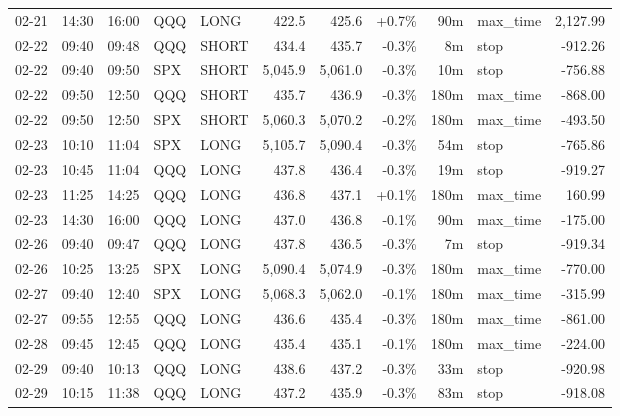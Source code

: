 \documentclass[11pt,a4paper,twoside]{article}
\begin{document}
\begin{center}
\begin{longtable}{>{\color{txtmain}}l l l l l r r r r >{\color{txtmain}}l r}
02-21 & 14:30 & 16:00 & QQQ & LONG & 422.5 & 425.6 & \textcolor{wingreen}{+0.7\%} & 90m & max\_time & \textcolor{wingreen}{2,127.99} \\
02-22 & 09:40 & 09:48 & QQQ & SHORT & 434.4 & 435.7 & \textcolor{lossred}{-0.3\%} & 8m & stop & \textcolor{lossred}{-912.26} \\
02-22 & 09:40 & 09:50 & SPX & SHORT & 5,045.9 & 5,061.0 & \textcolor{lossred}{-0.3\%} & 10m & stop & \textcolor{lossred}{-756.88} \\
02-22 & 09:50 & 12:50 & QQQ & SHORT & 435.7 & 436.9 & \textcolor{lossred}{-0.3\%} & 180m & max\_time & \textcolor{lossred}{-868.00} \\
02-22 & 09:50 & 12:50 & SPX & SHORT & 5,060.3 & 5,070.2 & \textcolor{lossred}{-0.2\%} & 180m & max\_time & \textcolor{lossred}{-493.50} \\
02-23 & 10:10 & 11:04 & SPX & LONG & 5,105.7 & 5,090.4 & \textcolor{lossred}{-0.3\%} & 54m & stop & \textcolor{lossred}{-765.86} \\
02-23 & 10:45 & 11:04 & QQQ & LONG & 437.8 & 436.4 & \textcolor{lossred}{-0.3\%} & 19m & stop & \textcolor{lossred}{-919.27} \\
02-23 & 11:25 & 14:25 & QQQ & LONG & 436.8 & 437.1 & \textcolor{wingreen}{+0.1\%} & 180m & max\_time & \textcolor{wingreen}{160.99} \\
02-23 & 14:30 & 16:00 & QQQ & LONG & 437.0 & 436.8 & \textcolor{lossred}{-0.1\%} & 90m & max\_time & \textcolor{lossred}{-175.00} \\
02-26 & 09:40 & 09:47 & QQQ & LONG & 437.8 & 436.5 & \textcolor{lossred}{-0.3\%} & 7m & stop & \textcolor{lossred}{-919.34} \\
02-26 & 10:25 & 13:25 & SPX & LONG & 5,090.4 & 5,074.9 & \textcolor{lossred}{-0.3\%} & 180m & max\_time & \textcolor{lossred}{-770.00} \\
02-27 & 09:40 & 12:40 & SPX & LONG & 5,068.3 & 5,062.0 & \textcolor{lossred}{-0.1\%} & 180m & max\_time & \textcolor{lossred}{-315.99} \\
02-27 & 09:55 & 12:55 & QQQ & LONG & 436.6 & 435.4 & \textcolor{lossred}{-0.3\%} & 180m & max\_time & \textcolor{lossred}{-861.00} \\
02-28 & 09:45 & 12:45 & QQQ & LONG & 435.4 & 435.1 & \textcolor{lossred}{-0.1\%} & 180m & max\_time & \textcolor{lossred}{-224.00} \\
02-29 & 09:40 & 10:13 & QQQ & LONG & 438.6 & 437.2 & \textcolor{lossred}{-0.3\%} & 33m & stop & \textcolor{lossred}{-920.98} \\
02-29 & 10:15 & 11:38 & QQQ & LONG & 437.2 & 435.9 & \textcolor{lossred}{-0.3\%} & 83m & stop & \textcolor{lossred}{-918.08} \\

\end{longtable}
\end{center}
\end{document}
